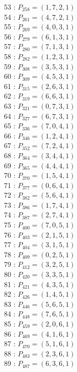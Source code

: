 \documentclass{article}
\begin{document}
{\begin{multicols}{3}
53 : $P_{258}=( 1, 7, 2, 1 )$\\
54 : $P_{261}=( 4, 7, 2, 1 )$\\
55 : $P_{269}=( 4, 0, 3, 1 )$\\
56 : $P_{279}=( 6, 1, 3, 1 )$\\
57 : $P_{280}=( 7, 1, 3, 1 )$\\
58 : $P_{282}=( 1, 2, 3, 1 )$\\
59 : $P_{308}=( 3, 5, 3, 1 )$\\
60 : $P_{309}=( 4, 5, 3, 1 )$\\
61 : $P_{315}=( 2, 6, 3, 1 )$\\
62 : $P_{319}=( 6, 6, 3, 1 )$\\
63 : $P_{321}=( 0, 7, 3, 1 )$\\
64 : $P_{327}=( 6, 7, 3, 1 )$\\
65 : $P_{336}=( 7, 0, 4, 1 )$\\
66 : $P_{346}=( 1, 2, 4, 1 )$\\
67 : $P_{352}=( 7, 2, 4, 1 )$\\
68 : $P_{364}=( 3, 4, 4, 1 )$\\
69 : $P_{365}=( 4, 4, 4, 1 )$\\
70 : $P_{370}=( 1, 5, 4, 1 )$\\
71 : $P_{377}=( 0, 6, 4, 1 )$\\
72 : $P_{382}=( 5, 6, 4, 1 )$\\
73 : $P_{386}=( 1, 7, 4, 1 )$\\
74 : $P_{387}=( 2, 7, 4, 1 )$\\
75 : $P_{400}=( 7, 0, 5, 1 )$\\
76 : $P_{403}=( 2, 1, 5, 1 )$\\
77 : $P_{404}=( 3, 1, 5, 1 )$\\
78 : $P_{409}=( 0, 2, 5, 1 )$\\
79 : $P_{412}=( 3, 2, 5, 1 )$\\
80 : $P_{420}=( 3, 3, 5, 1 )$\\
81 : $P_{421}=( 4, 3, 5, 1 )$\\
82 : $P_{426}=( 1, 4, 5, 1 )$\\
83 : $P_{446}=( 5, 6, 5, 1 )$\\
84 : $P_{448}=( 7, 6, 5, 1 )$\\
85 : $P_{459}=( 2, 0, 6, 1 )$\\
86 : $P_{469}=( 4, 1, 6, 1 )$\\
87 : $P_{470}=( 5, 1, 6, 1 )$\\
88 : $P_{483}=( 2, 3, 6, 1 )$\\
89 : $P_{487}=( 6, 3, 6, 1 )$\\

\end{multicols}}
\end{document}
